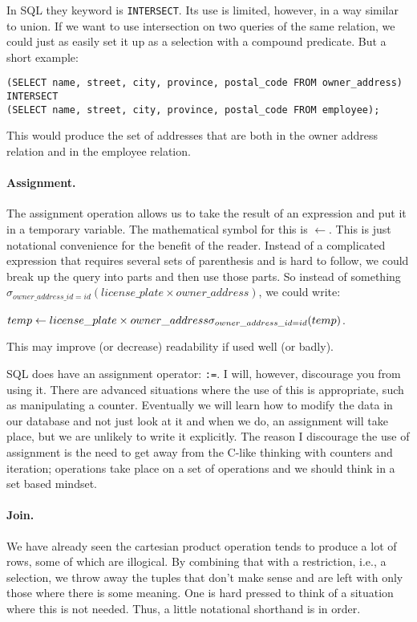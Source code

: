 \documentclass[a4paper]{report}
\begin{document}
In SQL they keyword is \texttt{INTERSECT}. Its use is limited, however, in a way similar to union. If we want to use intersection on two queries of the same relation, we could just as easily set it up as a selection with a compound predicate. But a short example:

\texttt{(SELECT name, street, city, province, postal\_code FROM owner\_address)\\ 
INTERSECT\\ 
(SELECT name, street, city, province, postal\_code FROM employee);}

This would produce the set of addresses that are both in the owner address relation and in the employee relation.

\paragraph{Assignment.} The assignment operation allows us to take the result of an expression and put it in a temporary variable. The mathematical symbol for this is $\leftarrow$. This is just notational convenience for the benefit of the reader. Instead of a complicated expression that requires several sets of parenthesis and is hard to follow, we could break up the query into parts and then use those parts. So instead of something $\sigma_{owner\_address\_id = id}( license\_plate \times owner\_address )$, we could write: 

$temp \leftarrow license\_plate \times owner\_address\\
\sigma_{owner\_address\_id = id}( temp ) $.

This may improve (or decrease) readability if used well (or badly).

SQL does have an assignment operator: \texttt{:=}. I will, however, discourage you from using it. There are advanced situations where the use of this is appropriate, such as manipulating a counter. Eventually we will learn how to modify the data in our database and not just look at it and when we do, an assignment will take place, but we are unlikely to write it explicitly. The reason I discourage the use of assignment is the need to get away from the C-like thinking with counters and iteration; operations take place on a set of operations and we should think in a set based mindset.

\paragraph{Join.} We have already seen the cartesian product operation tends to produce a lot of rows, some of which are illogical. By combining that with a restriction, i.e., a selection, we throw away the tuples that don't make sense and are left with only those where there is some meaning. One is hard pressed to think of a situation where this is not needed. Thus, a little notational shorthand is in order. 
\end{document}
